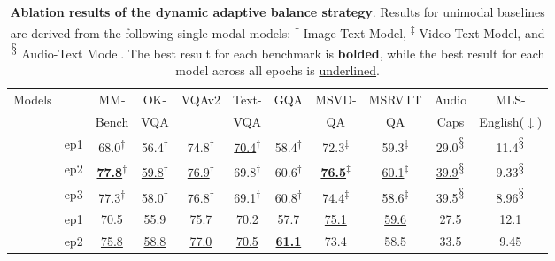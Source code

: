 \begin{table}[t]
\centering
\caption{
\textbf{Ablation results of the dynamic adaptive balance strategy}. Results for unimodal baselines are derived from the following single-modal models: \textsuperscript{$\dagger$} Image-Text Model, \textsuperscript{$\ddagger$} Video-Text Model, and \textsuperscript{
$\mathsection$} Audio-Text Model. The best result for each benchmark is \textbf{bolded}, while the best result for each model across all epochs is \underline{underlined}.
}
\setlength{\tabcolsep}{3pt}
\begin{tabular}{l|l|ccccc|cc|cc}
\toprule
Models &  & MM- & OK- & VQAv2 & Text- & GQA & MSVD- & MSRVTT & Audio & MLS- \\
& & Bench & VQA &&VQA&& QA & QA & Caps & English($\downarrow$) \\
\midrule
{} & ep1 & 68.0\textsuperscript{$\dagger$} & 56.4\textsuperscript{$\dagger$} & 74.8\textsuperscript{$\dagger$} & \underline{70.4}\textsuperscript{$\dagger$} & 58.4\textsuperscript{$\dagger$} & 72.3\textsuperscript{$\ddagger$} & 59.3\textsuperscript{$\ddagger$} & 29.0\textsuperscript{$\mathsection$} & 11.4\textsuperscript{$\mathsection$} \\
& ep2 & \underline{\textbf{77.8}}\textsuperscript{$\dagger$} & \underline{59.8}\textsuperscript{$\dagger$} & \underline{76.9}\textsuperscript{$\dagger$} & 69.8\textsuperscript{$\dagger$} & 60.6\textsuperscript{$\dagger$} & \underline{\textbf{76.5}}\textsuperscript{$\ddagger$} & \underline{60.1}\textsuperscript{$\ddagger$} & \underline{39.9}\textsuperscript{$\mathsection$} & 9.33\textsuperscript{$\mathsection$} \\
& ep3 & 77.3\textsuperscript{$\dagger$} & 58.0\textsuperscript{$\dagger$} & 76.8\textsuperscript{$\dagger$} & 69.1\textsuperscript{$\dagger$} & \underline{60.8}\textsuperscript{$\dagger$} & 74.4\textsuperscript{$\ddagger$} & 58.6\textsuperscript{$\ddagger$} & 39.5\textsuperscript{$\mathsection$} & \underline{8.96}\textsuperscript{$\mathsection$} \\
\midrule
{}
& ep1 & 70.5 & 55.9 & 75.7 & 70.2 & 57.7 & \underline{75.1} & \underline{59.6} & 27.5 & 12.1 \\
& ep2 & \underline{75.8} & \underline{58.8} & \underline{77.0} & \underline{70.5} & \underline{\textbf{61.1}} & 73.4 & 58.5 & 33.5 & 9.45 \\

\end{tabular}
\end{table}
